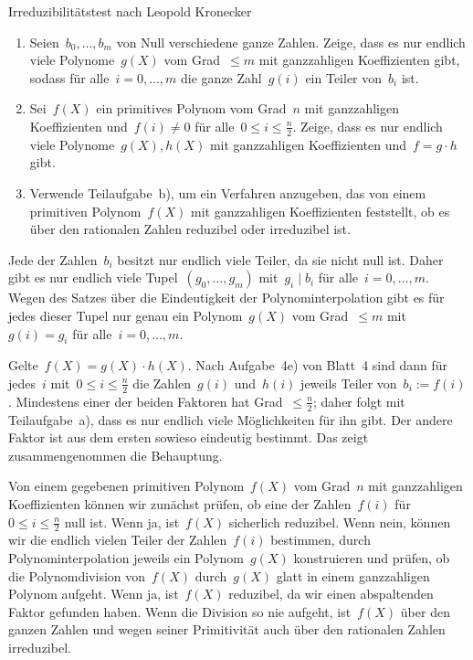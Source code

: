 \documentclass{algblatt}
\begin{document}
\begin{aufgabe}{Irreduzibilitätstest nach Leopold Kronecker}
\begin{enumerate}
\item Seien~$b_0,\ldots,b_m$ von Null verschiedene ganze Zahlen. Zeige, dass es
nur endlich viele Polynome~$g(X)$ vom Grad~$\leq m$ mit ganzzahligen Koeffizienten
gibt, sodass für alle~$i = 0,\ldots,m$ die ganze Zahl~$g(i)$ ein Teiler
von~$b_i$ ist.
\item Sei~$f(X)$ ein primitives Polynom vom Grad~$n$ mit ganzzahligen
Koeffizienten und~$f(i) \neq 0$ für alle~$0 \leq i \leq \frac{n}{2}$. Zeige,
dass es nur endlich viele Polynome~$g(X), h(X)$ mit ganzzahligen Koeffizienten
und~$f = g \cdot h$ gibt.
\item Verwende Teilaufgabe~b), um ein Verfahren anzugeben, das von einem
primitiven Polynom~$f(X)$ mit ganzzahligen Koeffizienten feststellt, ob es
über den rationalen Zahlen reduzibel oder irreduzibel ist.
\end{enumerate}

\begin{loesungE}
\item Jede der Zahlen~$b_i$ besitzt nur endlich viele Teiler, da sie nicht null
ist. Daher gibt es nur endlich viele Tupel~$(g_0,\ldots,g_m)$ mit~$g_i \mid
b_i$ für alle~$i = 0,\ldots,m$. Wegen des Satzes über die Eindeutigkeit der
Polynominterpolation gibt es für jedes dieser Tupel nur genau ein
Polynom~$g(X)$ vom Grad~$\leq m$ mit~$g(i)
= g_i$ für alle~$i = 0,\ldots,m$.

\item Gelte~$f(X) = g(X) \cdot h(X)$.
Nach Aufgabe~4e) von Blatt~4 sind dann
für jedes~$i$ mit~$0 \leq i \leq \frac{n}{2}$ die Zahlen~$g(i)$ und~$h(i)$
jeweils Teiler von~$b_i := f(i)$. Mindestens einer der beiden Faktoren hat
Grad~$\leq \frac{n}{2}$; daher folgt mit Teilaufgabe~a), dass es nur endlich
viele Möglichkeiten für ihn gibt. Der andere Faktor ist aus dem ersten sowieso
eindeutig bestimmt. Das zeigt zusammengenommen die Behauptung.

\item Von einem gegebenen primitiven Polynom~$f(X)$ vom Grad~$n$ mit ganzzahligen
Koeffizienten können wir zunächst prüfen, ob eine der Zahlen~$f(i)$ für~$0 \leq i
\leq \frac{n}{2}$ null ist. Wenn ja, ist~$f(X)$ sicherlich reduzibel. Wenn
nein, können wir die endlich vielen Teiler der Zahlen~$f(i)$ bestimmen, durch
Polynominterpolation jeweils ein Polynom~$g(X)$ konstruieren und prüfen, ob die
Polynomdivision von~$f(X)$ durch~$g(X)$ glatt in einem ganzzahligen Polynom
aufgeht. Wenn ja, ist~$f(X)$ reduzibel, da wir einen abspaltenden Faktor
gefunden haben. Wenn die Division so nie aufgeht, ist~$f(X)$ über den ganzen
Zahlen und wegen seiner Primitivität auch über den rationalen Zahlen
irreduzibel.


\end{loesungE}
\end{aufgabe}
\end{document}
